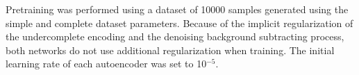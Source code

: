 Pretraining was performed using a dataset of 10000 samples generated using the simple and complete dataset parameters. Because of the implicit regularization of the undercomplete encoding and the denoising background subtracting process, both networks do not use additional regularization when training. The initial learning rate of each autoencoder was set to 10$^{-5}$.















